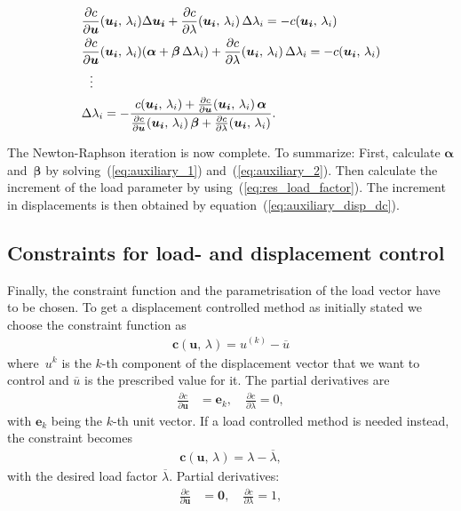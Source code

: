 %
\begin{align}
&\frac{\partial c}{\partial \boldsymbol{u}}(\boldsymbol{u_{i}},\,\lambda_{i})\Delta\boldsymbol{u_{i}} + \frac{\partial c}{\partial \lambda}(\boldsymbol{u_{i}},\,\lambda_{i})\,\Delta \lambda_{i} = -c(\boldsymbol{u_{i}},\,\lambda_{i})\notag\\
&\frac{\partial c}{\partial \boldsymbol{u}}(\boldsymbol{u_{i}},\,\lambda_{i})(\boldsymbol{\alpha} + \boldsymbol{\beta}\,\Delta \lambda_{i}) + \frac{\partial c}{\partial \lambda}(\boldsymbol{u_{i}},\,\lambda_{i})\,\Delta \lambda_{i} = -c(\boldsymbol{u_{i}},\,\lambda_{i})\notag\\
&\ \ \vdots\notag\\
&\Delta \lambda_{i} = -\frac{c(\boldsymbol{u_{i}},\,\lambda_{i}) + \frac{\partial c}{\partial \boldsymbol{u}}(\boldsymbol{u_{i}},\,\lambda_{i})\,\boldsymbol{\alpha}}{\frac{\partial c}{\partial \boldsymbol{u}}(\boldsymbol{u_{i}},\,\lambda_{i})\,\boldsymbol{\beta} + \frac{\partial c}{\partial \lambda}(\boldsymbol{u_{i}},\,\lambda_{i})}.\label{eq:res_load_factor}
\end{align}

The Newton-Raphson iteration is now complete. To summarize: First, calculate $\boldsymbol{\alpha}$ and~$\boldsymbol{\beta}$ by solving~(\ref{eq:auxiliary_1}) and~(\ref{eq:auxiliary_2}). Then calculate the increment of the load parameter by using~(\ref{eq:res_load_factor}). The increment in displacements is then obtained by equation~(\ref{eq:auxiliary_disp_dc}).\\

\subsection{Constraints for load- and displacement control}

Finally, the constraint function and the parametrisation of the load vector have to be chosen. To get a displacement controlled method as initially stated we choose the constraint function as
%
\begin{align}
\boldsymbol{c}(\boldsymbol{u},\,\lambda) = u^{(k)} - \overline{u}
\end{align}
%
where~$u^k$ is the $k$-th component of the displacement vector that we want to control and $\overline{u}$ is the prescribed value for it. The partial derivatives are
%
\begin{align*}
\frac{\partial c}{\partial \boldsymbol{u}} &= \boldsymbol{e}_k,\quad
\frac{\partial c}{\partial \lambda} = 0,
\end{align*}
%
with $\boldsymbol{e}_k$ being the $k$-th unit vector. If a load controlled method is needed instead, the constraint becomes
%
\begin{align}
\boldsymbol{c}(\boldsymbol{u},\,\lambda) = \lambda - \overline{\lambda},
\end{align}
%
with the desired load factor $\overline{\lambda}$. Partial derivatives:
%
\begin{align*}
\frac{\partial c}{\partial \boldsymbol{u}} &= \boldsymbol{0},\quad
\frac{\partial c}{\partial \lambda} = 1,
\end{align*}

